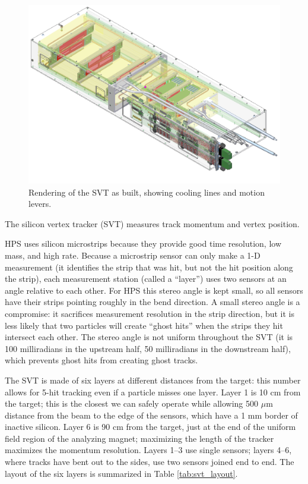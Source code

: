 \begin{figure}[htp]
    \includegraphics[width=\textwidth]{detector/figs/svt_drawing}
    \caption{Rendering of the SVT as built, showing cooling lines and motion levers.}
    \label{fig:svt-drawing}
\end{figure}

The silicon vertex tracker (SVT) measures track momentum and vertex position.

HPS uses silicon microstrips because they provide good time resolution, low mass, and high rate.
Because a microstrip sensor can only make a 1-D measurement (it identifies the strip that was hit, but not the hit position along the strip), each measurement station (called a ``layer'') uses two sensors at an angle relative to each other.
For HPS this stereo angle is kept small, so all sensors have their strips pointing roughly in the bend direction.
A small stereo angle is a compromise: it sacrifices measurement resolution in the strip direction, but it is less likely that two particles will create ``ghost hits'' when the strips they hit intersect each other.
The stereo angle is not uniform throughout the SVT (it is 100 milliradians in the upstream half, 50 milliradians in the downstream half), which prevents ghost hits from creating ghost tracks.

The SVT is made of six layers at different distances from the target: this number allows for 5-hit tracking even if a particle misses one layer.
Layer 1 is 10 cm from the target; this is the closest we can safely operate while allowing 500 $\mu$m distance from the beam to the edge of the sensors, which have a 1 mm border of inactive silicon.
Layer 6 is 90 cm from the target, just at the end of the uniform field region of the analyzing magnet; maximizing the length of the tracker maximizes the momentum resolution.
Layers 1--3 use single sensors; layers 4--6, where tracks have bent out to the sides, use two sensors joined end to end.
The layout of the six layers is summarized in Table \ref{tab:svt_layout}.

